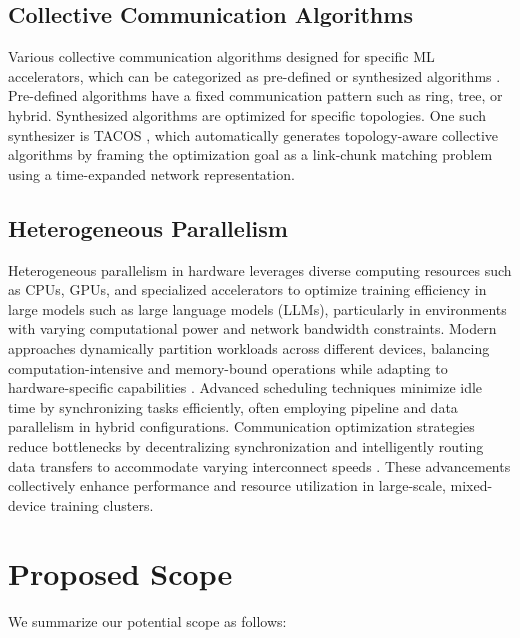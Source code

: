 \documentclass{article}
\begin{document}
\subsection{Collective Communication Algorithms}

Various collective communication algorithms designed for specific ML accelerators, which can be categorized as pre-defined or synthesized algorithms \cite{duan2024efficient}. Pre-defined algorithms have a fixed communication pattern such as ring, tree, or hybrid. Synthesized algorithms are optimized for specific topologies. One such synthesizer is TACOS \cite{won2024tacos}, which automatically generates topology-aware collective algorithms by framing the optimization goal as a link-chunk matching problem using a time-expanded network representation.

\subsection{Heterogeneous Parallelism}

Heterogeneous parallelism \cite{duan2024efficient} in hardware leverages diverse computing resources such as CPUs, GPUs, and specialized accelerators to optimize training efficiency in large models such as large language models (LLMs), particularly in environments with varying computational power and network bandwidth constraints. Modern approaches dynamically partition workloads across different devices, balancing computation-intensive and memory-bound operations while adapting to hardware-specific capabilities \cite{park2020hetpipe}. Advanced scheduling techniques minimize idle time by synchronizing tasks efficiently, often employing pipeline and data parallelism in hybrid configurations. Communication optimization strategies reduce bottlenecks by decentralizing synchronization and intelligently routing data transfers to accommodate varying interconnect speeds \cite{miao2023sdpipe}. These advancements collectively enhance performance and resource utilization in large-scale, mixed-device training clusters.

\section{Proposed Scope}


We summarize our potential scope as follows:
\end{document}
